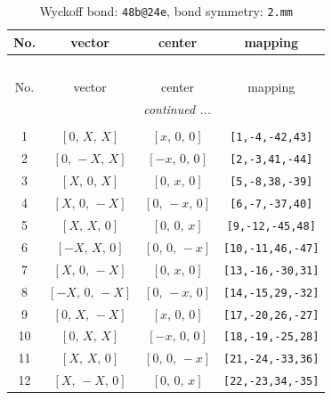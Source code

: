 \documentclass[fleqn,8pt]{jsarticle}
\begin{document}
\renewcommand{\arraystretch}{1.2}
\begin{longtable}{cccc}
\caption{Wyckoff bond: {\tt 48b@24e}, bond symmetry: {\tt 2.mm}}
 \\
 \hline \hline
No. & vector & center & mapping \\ \hline \endfirsthead

\multicolumn{3}{l}{\tablename\ \thetable{}} \\
 \hline \hline
No. & vector & center & mapping \\ \hline \endhead

 \hline \hline
\multicolumn{3}{r}{\footnotesize\it continued ...} \\ \endfoot

 \hline \hline
\multicolumn{3}{r}{} \\ \endlastfoot

1 & $\left[ 0,\, X,\, X \right]$ & $\left[ x,\, 0,\, 0 \right]$ & {\tt [1,-4,-42,43]} \\ \hline
2 & $\left[ 0,\, - X,\, X \right]$ & $\left[ - x,\, 0,\, 0 \right]$ & {\tt [2,-3,41,-44]} \\ \hline
3 & $\left[ X,\, 0,\, X \right]$ & $\left[ 0,\, x,\, 0 \right]$ & {\tt [5,-8,38,-39]} \\ \hline
4 & $\left[ X,\, 0,\, - X \right]$ & $\left[ 0,\, - x,\, 0 \right]$ & {\tt [6,-7,-37,40]} \\ \hline
5 & $\left[ X,\, X,\, 0 \right]$ & $\left[ 0,\, 0,\, x \right]$ & {\tt [9,-12,-45,48]} \\ \hline
6 & $\left[ - X,\, X,\, 0 \right]$ & $\left[ 0,\, 0,\, - x \right]$ & {\tt [10,-11,46,-47]} \\ \hline
7 & $\left[ X,\, 0,\, - X \right]$ & $\left[ 0,\, x,\, 0 \right]$ & {\tt [13,-16,-30,31]} \\ \hline
8 & $\left[ - X,\, 0,\, - X \right]$ & $\left[ 0,\, - x,\, 0 \right]$ & {\tt [14,-15,29,-32]} \\ \hline
9 & $\left[ 0,\, X,\, - X \right]$ & $\left[ x,\, 0,\, 0 \right]$ & {\tt [17,-20,26,-27]} \\ \hline
10 & $\left[ 0,\, X,\, X \right]$ & $\left[ - x,\, 0,\, 0 \right]$ & {\tt [18,-19,-25,28]} \\ \hline
11 & $\left[ X,\, X,\, 0 \right]$ & $\left[ 0,\, 0,\, - x \right]$ & {\tt [21,-24,-33,36]} \\ \hline
12 & $\left[ X,\, - X,\, 0 \right]$ & $\left[ 0,\, 0,\, x \right]$ & {\tt [22,-23,34,-35]} \\
\end{longtable}
\end{document}
